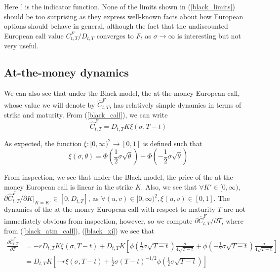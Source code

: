 \documentclass{article}
\numberwithin{equation}{section}
\begin{document}
Here $ \mathbb{I} $ is the indicator function. None of the limits shown in
(\ref{black_limits}) should be too surprising as they express well-known facts
about how European options should behave in general, although the fact that the
undiscounted European call value $ C_{t, T}^F / D_{t, T} $ converges to $ F_t $
as $ \sigma \rightarrow \infty $ is interesting but not very useful.

\subsection{At-the-money dynamics}

We can also see that under the Black model, the at-the-money European call,
whose value we will denote by $ \hat{C}_{t, T}^F $, has relatively simple
dynamics in terms of strike and maturity. From (\ref{black_call}), we can write
\begin{equation} \label{black_atm_call}
    \hat{C}_{t, T}^F = D_{t, T}K\xi(\sigma, T - t)
\end{equation}

As expected, the function $ \xi : [0, \infty)^2 \rightarrow [0, 1] $ is defined
such that
\begin{equation} \label{black_xi}
    \xi(\sigma, \theta) = \Phi\left(\frac{1}{2}\sigma\sqrt{\theta}\right) -
    \Phi\left(-\frac{1}{2}\sigma\sqrt{\theta}\right)
\end{equation}

From inspection, we see that under the Black model, the price of the
at-the-money European call is linear in the strike $ K $. Also, we see that
$ \forall K' \in [0, \infty) $,
$ \partial \hat{C}_{t, T}^F / \partial K \vert_{K = K'} \in [0, D_{t, T}] $, as
$ \forall (u, v) \in [0, \infty)^2, \xi(u, v) \in [0, 1] $. The dynamics of the
at-the-money European call with respect to maturity $ T $ are not immediately
obvious from inspection, however, so we compute
$ \partial \hat{C}_{t, T}^F / \partial T $, where from (\ref{black_atm_call}),
(\ref{black_xi}) we see that
\begin{equation*}
    \begin{split}
        \frac{\partial \hat{C}_{t, T}^F}{\partial T} & =
        -rD_{t, T}K\xi(\sigma, T - t) + D_{t, T}K\left[
            \phi\left(
                \frac{1}{2}\sigma\sqrt{T - t}
            \right)\frac{\sigma}{4\sqrt{T - t}} +
            \phi\left(
                -\frac{1}{2}\sigma\sqrt{T - t}
            \right)\frac{\sigma}{4\sqrt{T - t}}
        \right] \\ & =
        D_{t, T}K\left[
            -r\xi(\sigma, T - t) + \frac{1}{2}\sigma(T - t)^{-1 / 2}\phi\left(
                \frac{1}{2}\sigma\sqrt{T - t}
            \right)
        \right]
    \end{split}
\end{equation*}
\end{document}
